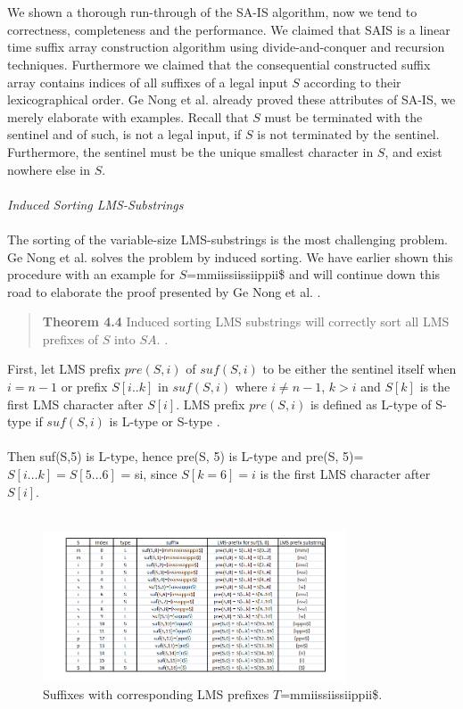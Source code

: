 \documentclass[12pt]{article} %
\begin{document}
\\ \\
We shown a thorough run-through of the SA-IS algorithm, now we tend to correctness, completeness and the performance. We claimed that SAIS is a linear time suffix array construction algorithm using divide-and-conquer and recursion techniques. Furthermore we claimed that the consequential constructed suffix array contains indices of all suffixes of a legal input $S$ according to their lexicographical order. Ge Nong et al. \cite{twoeffecient} already proved these attributes of SA-IS, we merely elaborate with examples. Recall that $S$ must be terminated with the sentinel and of such, is not a legal input, if $S$ is not terminated by the sentinel. Furthermore, the sentinel must be the unique smallest character in $S$, and exist nowhere else in $S$.  
\\ \\
\textit{Induced Sorting LMS-Substrings}
\\ \\
The sorting of the variable-size LMS-substrings is the most challenging problem. Ge Nong et al. \cite{twoeffecient} solves the problem by induced sorting. We have earlier shown this procedure with an example for $S$=mmiissiissiippii\$ and will continue down this road to elaborate the proof presented by Ge Nong et al. \cite{twoeffecient}.
\begin{quote}
\textbf{Theorem 4.4} Induced sorting LMS substrings will correctly sort all LMS prefixes of $S$ into $SA$. \cite{twoeffecient}.
\end{quote}
First, let LMS prefix $pre(S, i)$ of $suf(S, i)$ to be either the sentinel itself when $i = n-1$ or prefix $S[i..k]$ in $suf(S, i)$ where $i \neq n-1$, $k > i$ and $S[k]$ is the first LMS character after $S[i]$. LMS prefix $pre(S,i)$ is defined as L-type of S-type if $suf(S, i)$ is L-type or S-type \cite{twoeffecient}.
\\ \\
Then suf(S,5) is L-type, hence pre(S, 5) is L-type and pre(S, 5)=$S[i \ldots k] = S[5 \ldots 6]$ = si, since $S[k=6]=i$ is the first LMS character after $S[i]$. 
\\ \\
\begin{figure}[H]
    \centering
    \includegraphics[width=0.8\textwidth]{lmsprefix}
    \captionsetup{width=0.8\textwidth}
    \caption{Suffixes with corresponding LMS prefixes $T$=mmiissiissiippii\$.}
    \label{fig:lmsprefix}  
\end{figure}
\end{document}
